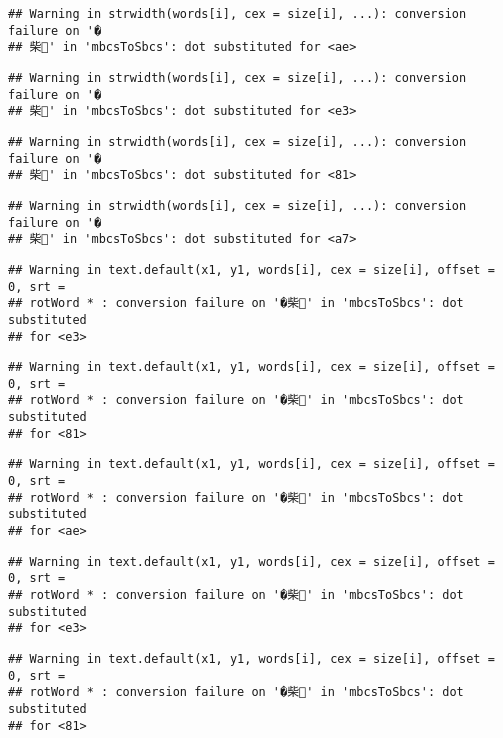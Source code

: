 \documentclass[]{article}
\begin{document}
\begin{verbatim}
## Warning in strwidth(words[i], cex = size[i], ...): conversion failure on '�
## 柴' in 'mbcsToSbcs': dot substituted for <ae>
\end{verbatim}

\begin{verbatim}
## Warning in strwidth(words[i], cex = size[i], ...): conversion failure on '�
## 柴' in 'mbcsToSbcs': dot substituted for <e3>
\end{verbatim}

\begin{verbatim}
## Warning in strwidth(words[i], cex = size[i], ...): conversion failure on '�
## 柴' in 'mbcsToSbcs': dot substituted for <81>
\end{verbatim}

\begin{verbatim}
## Warning in strwidth(words[i], cex = size[i], ...): conversion failure on '�
## 柴' in 'mbcsToSbcs': dot substituted for <a7>
\end{verbatim}

\begin{verbatim}
## Warning in text.default(x1, y1, words[i], cex = size[i], offset = 0, srt =
## rotWord * : conversion failure on '�柴' in 'mbcsToSbcs': dot substituted
## for <e3>
\end{verbatim}

\begin{verbatim}
## Warning in text.default(x1, y1, words[i], cex = size[i], offset = 0, srt =
## rotWord * : conversion failure on '�柴' in 'mbcsToSbcs': dot substituted
## for <81>
\end{verbatim}

\begin{verbatim}
## Warning in text.default(x1, y1, words[i], cex = size[i], offset = 0, srt =
## rotWord * : conversion failure on '�柴' in 'mbcsToSbcs': dot substituted
## for <ae>
\end{verbatim}

\begin{verbatim}
## Warning in text.default(x1, y1, words[i], cex = size[i], offset = 0, srt =
## rotWord * : conversion failure on '�柴' in 'mbcsToSbcs': dot substituted
## for <e3>
\end{verbatim}

\begin{verbatim}
## Warning in text.default(x1, y1, words[i], cex = size[i], offset = 0, srt =
## rotWord * : conversion failure on '�柴' in 'mbcsToSbcs': dot substituted
## for <81>
\end{verbatim}
\end{document}
